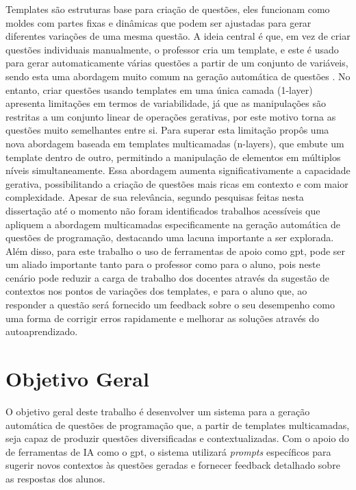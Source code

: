 Templates são estruturas base para criação de questões, eles funcionam como moldes com partes fixas e dinâmicas que podem ser ajustadas para gerar diferentes variações de uma mesma questão. A ideia central é que, em vez de criar questões individuais manualmente, o professor cria um template, e este é usado para gerar automaticamente várias questões a partir de um conjunto de variáveis, sendo esta uma abordagem muito comum na geração automática de questões \parencite{zavala2018}.  No entanto, criar questões usando templates em uma única camada (1-layer) apresenta limitações em termos de variabilidade, já que as manipulações são restritas a um conjunto linear de operações gerativas, por  este motivo torna as questões muito semelhantes entre si. Para superar esta limitação \parencite{lai2013} propôs uma nova abordagem baseada em templates multicamadas (n-layers), que embute um template dentro de outro, permitindo a manipulação de elementos em múltiplos níveis simultaneamente. Essa abordagem aumenta significativamente a capacidade gerativa, possibilitando a criação de questões mais ricas em contexto e com maior complexidade. Apesar de sua relevância, segundo pesquisas feitas nesta dissertação até o momento não foram identificados trabalhos acessíveis que apliquem a abordagem multicamadas especificamente na geração automática de questões de programação, destacando uma lacuna importante a ser explorada. Além disso, para este trabalho o uso de ferramentas de apoio como  \gls{gpt}, pode ser um aliado importante tanto para o professor como para o aluno, pois neste cenário pode reduzir a carga de trabalho dos docentes através da sugestão de contextos nos pontos de variações dos templates, e para o aluno que, ao responder a questão será fornecido um feedback  sobre o seu desempenho como uma forma de corrigir erros rapidamente e melhorar as soluções através do autoaprendizado.

\section{Objetivo Geral}

O objetivo geral deste trabalho é desenvolver um sistema para a geração automática de questões de programação que, a partir de templates multicamadas, seja capaz de produzir questões diversificadas e contextualizadas. Com o apoio do de ferramentas de IA como o \gls{gpt}, o sistema utilizará \textit{prompts} específicos para sugerir novos contextos às questões geradas e fornecer feedback detalhado  sobre as respostas dos alunos.

